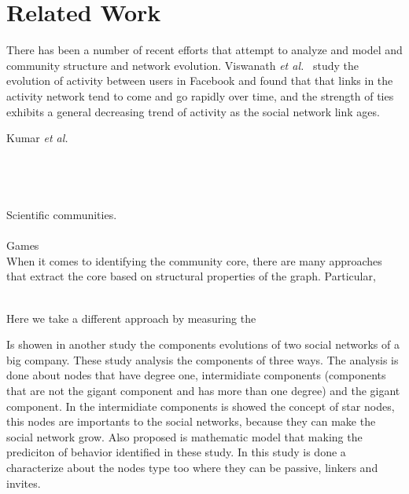 \section{Related Work}



There has been a number of recent efforts that attempt to analyze and model and community structure and network evolution.  Viswanath \textit{et al.}~\cite{Viswanath:2009} study
the evolution of activity between users in Facebook and found that that links in the activity network tend to come and go rapidly over time, and the strength of ties exhibits a
general decreasing trend of activity as the social network link ages.

Kumar \textit{et al.}~\cite{Kumar:2006} 
\cite{Backstrom:2006} \\
\cite{Patil:2012} \\
\cite{Leskovec:2005} \\
\cite{Leskovec:2008} \\
\cite{Wu:2009} \\

Scientific communities. 
\cite{Lopes:2011} \\
\cite{Huang:2008} \\

Games
\cite{Ducheneaut:2007} \\


When it comes to identifying the community core, there are many approaches that extract the core based on structural properties of the graph. 
Particular, 


\cite{Sachan:2012} \\
\cite{Seifi:2012:CCE:2187980.2188258}
Here we take a different approach by measuring the 

Is showen in another study \cite{Kumar:2006} the components evolutions of two social networks of a big company. These 
study analysis the components of three ways. The analysis is done about nodes that have degree one, intermidiate components 
(components that are not the gigant component and has more than one degree) and the gigant component. In the intermidiate 
components is showed the concept of star nodes, this nodes are importants to the social networks, because they can make 
the social network grow. Also proposed is mathematic model that making the prediciton of behavior identified in these 
study. In this study \cite{Kumar:2006} is done a characterize about the nodes type too where they can be passive, 
linkers and invites.
\\



